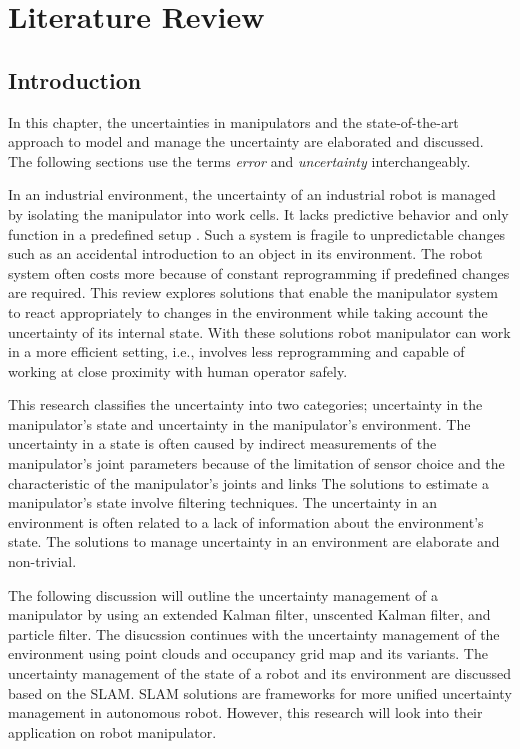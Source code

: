 

\chapter{Literature Review}
\label{chap:lit_review}

\section{Introduction} 
\label{sec:chapter2_introduction}
In this chapter, the uncertainties in manipulators and the 
state-of-the-art approach to model and manage 
the uncertainty are elaborated and discussed.
The following sections use the terms \textit{error} 
and \textit{uncertainty} interchangeably. 

In an industrial environment, the uncertainty of an industrial robot is managed 
by isolating the manipulator into work cells. It lacks predictive behavior and 
only function in a predefined setup \parencite{Miseikis2017}. Such a system is 
fragile to unpredictable changes such as an accidental introduction to an object
in its environment. The robot system often costs more because of constant reprogramming 
if predefined changes are required. This review  explores solutions that enable the 
manipulator system to react appropriately to changes in the environment while taking 
account the uncertainty of its internal state. With these solutions
robot manipulator can work in a more efficient setting, i.e., involves less reprogramming and 
capable of working at close proximity with human operator safely.

This research classifies the uncertainty into two categories; 
uncertainty in the manipulator’s state and 
uncertainty in the manipulator’s environment. 
The uncertainty in a state is often caused by 
indirect measurements of the manipulator’s joint 
parameters because of the limitation of sensor choice 
\parencite{Jassemi-Zargani2002,Hebert2012,Rigatos2009,Janabi-Sharifi2010,Du2014}
and the characteristic of the manipulator’s joints and links 
\parencite{Lertpiriyasuwat2000,Ulrich2011,Lightcap2010,Badamchizadeh2010,Sawada2012}
The solutions to estimate a manipulator’s state involve filtering techniques. 
The uncertainty in an environment is often related to a lack of information about the environment’s state. 
The solutions to manage uncertainty in an environment are elaborate and non-trivial.

The following discussion will outline the uncertainty management 
of a manipulator by using an 
extended Kalman filter, unscented Kalman filter, and particle filter. 
The disucssion continues with the uncertainty management of the 
environment using point clouds and 
occupancy grid map and its variants. The uncertainty management
of the state of a robot and its environment are discussed 
based on the \acrlong{SLAM}. SLAM solutions are frameworks for more unified 
uncertainty management in autonomous robot. However, this
research will look into their application on robot manipulator.

